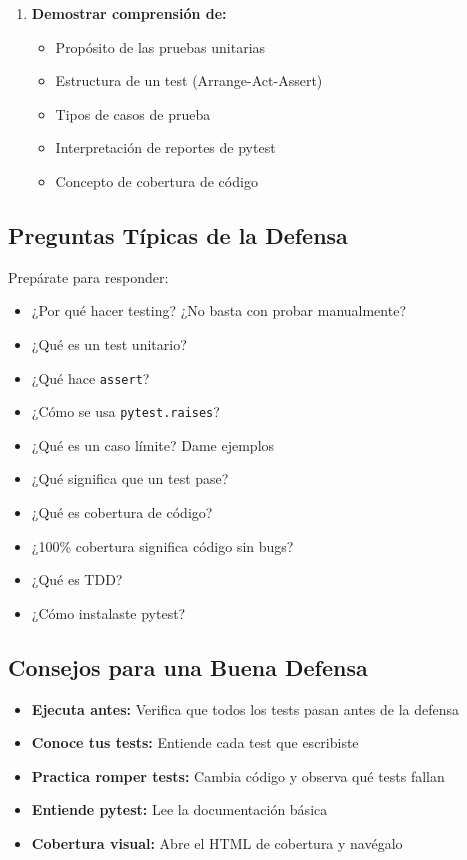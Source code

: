 \documentclass[12pt,a4paper]{article}
\begin{document}
\begin{enumerate}[leftmargin=*]
    \item \textbf{Demostrar comprensión de:}
    \begin{itemize}
        \item Propósito de las pruebas unitarias
        \item Estructura de un test (Arrange-Act-Assert)
        \item Tipos de casos de prueba
        \item Interpretación de reportes de pytest
        \item Concepto de cobertura de código
    \end{itemize}
\end{enumerate}

\subsection{Preguntas Típicas de la Defensa}

Prepárate para responder:

\begin{itemize}[leftmargin=*]
    \item ¿Por qué hacer testing? ¿No basta con probar manualmente?
    \item ¿Qué es un test unitario?
    \item ¿Qué hace \texttt{assert}?
    \item ¿Cómo se usa \texttt{pytest.raises}?
    \item ¿Qué es un caso límite? Dame ejemplos
    \item ¿Qué significa que un test pase?
    \item ¿Qué es cobertura de código?
    \item ¿100\% cobertura significa código sin bugs?
    \item ¿Qué es TDD?
    \item ¿Cómo instalaste pytest?
\end{itemize}

\subsection{Consejos para una Buena Defensa}

\begin{itemize}[leftmargin=*]
    \item \textbf{Ejecuta antes:} Verifica que todos los tests pasan antes de la defensa
    \item \textbf{Conoce tus tests:} Entiende cada test que escribiste
    \item \textbf{Practica romper tests:} Cambia código y observa qué tests fallan
    \item \textbf{Entiende pytest:} Lee la documentación básica
    \item \textbf{Cobertura visual:} Abre el HTML de cobertura y navégalo
\end{itemize}
\end{document}
